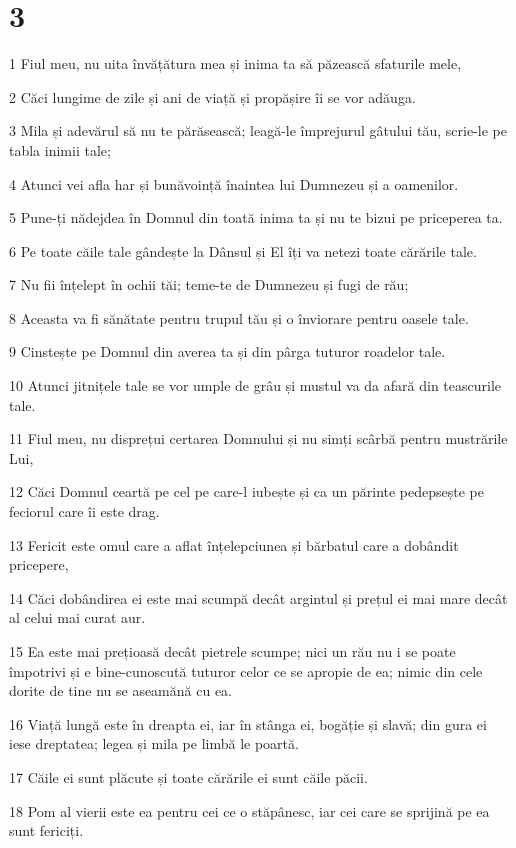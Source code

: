 \chapter{3}

\par 1 Fiul meu, nu uita învățătura mea și inima ta să păzească sfaturile mele,
\par 2 Căci lungime de zile și ani de viață și propășire îi se vor adăuga.
\par 3 Mila și adevărul să nu te părăsească; leagă-le împrejurul gâtului tău, scrie-le pe tabla inimii tale;
\par 4 Atunci vei afla har și bunăvoință înaintea lui Dumnezeu și a oamenilor.
\par 5 Pune-ți nădejdea în Domnul din toată inima ta și nu te bizui pe priceperea ta.
\par 6 Pe toate căile tale gândește la Dânsul și El îți va netezi toate cărările tale.
\par 7 Nu fii înțelept în ochii tăi; teme-te de Dumnezeu și fugi de rău;
\par 8 Aceasta va fi sănătate pentru trupul tău și o înviorare pentru oasele tale.
\par 9 Cinstește pe Domnul din averea ta și din pârga tuturor roadelor tale.
\par 10 Atunci jitnițele tale se vor umple de grâu și mustul va da afară din teascurile tale.
\par 11 Fiul meu, nu disprețui certarea Domnului și nu simți scârbă pentru mustrările Lui,
\par 12 Căci Domnul ceartă pe cel pe care-l iubește și ca un părinte pedepsește pe feciorul care îi este drag.
\par 13 Fericit este omul care a aflat înțelepciunea și bărbatul care a dobândit pricepere,
\par 14 Căci dobândirea ei este mai scumpă decât argintul și prețul ei mai mare decât al celui mai curat aur.
\par 15 Ea este mai prețioasă decât pietrele scumpe; nici un rău nu i se poate împotrivi și e bine-cunoscută tuturor celor ce se apropie de ea; nimic din cele dorite de tine nu se aseamănă cu ea.
\par 16 Viață lungă este în dreapta ei, iar în stânga ei, bogăție și slavă; din gura ei iese dreptatea; legea și mila pe limbă le poartă.
\par 17 Căile ei sunt plăcute și toate cărările ei sunt căile păcii.
\par 18 Pom al vierii este ea pentru cei ce o stăpânesc, iar cei care se sprijină pe ea sunt fericiți.
